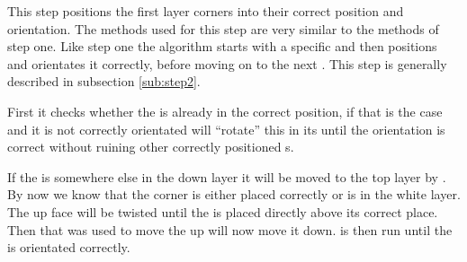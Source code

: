 This step positions the first layer corners into their correct position and orientation. The methods used for this step are very similar to the methods of step one. 
Like step one the algorithm starts with a specific \cpiece{} and then positions and orientates it correctly, before moving on to the next \cpiece. 
This step is generally described in subsection \ref{sub:step2}.

First it checks whether the \cubie{} is already in the correct position, if that is the case and it is not correctly orientated  will ``rotate'' this \cpiece{} in its \cubicle{} until the orientation is correct without ruining other correctly positioned \cpiece{}s.

If the \cpiece{} is somewhere else in the down layer it will be moved to the top layer by . 
By now we know that the corner \cpiece{} is either placed correctly or is in the white layer. 
The up face will be twisted until the \cpiece{} is placed directly above its correct place. 
Then  that was used to move the \cpiece{} up will now move it down. 
 is then run until the \cpiece{} is orientated correctly.